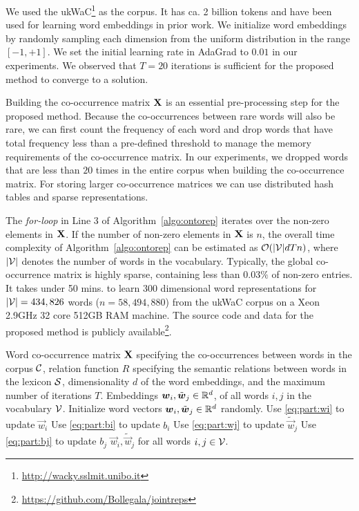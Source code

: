 \documentclass[letterpaper]{article}
\begin{document}
We used the ukWaC\footnote{\url{http://wacky.sslmit.unibo.it}} as the corpus.
It has ca. 2 billion tokens and have been used for learning word embeddings in prior work.
We initialize word embeddings by randomly sampling each dimension from the uniform distribution in the range $[-1,+1]$.
We set the initial learning rate in AdaGrad to $0.01$ in our experiments.
We observed that $T = 20$ iterations is sufficient for the proposed method to converge to a solution.

Building the co-occurrence matrix $\text{\bf X}$ is an essential pre-processing step for the proposed method.
Because the co-occurrences between rare words will also be rare, we can first count the frequency of each word and
drop words that have total frequency less than a pre-defined threshold to manage the memory requirements of the
co-occurrence matrix. In our experiments, we dropped words that are less than $20$ times in the entire corpus
when building the co-occurrence matrix.
For storing larger co-occurrence matrices we can use distributed hash tables and sparse representations.

The \emph{for-loop} in Line 3 of Algorithm~\ref{algo:ontorep} iterates over the non-zero
elements in $\text{\bf X}$. If the number of non-zero elements in $\text{\bf X}$ is $n$, the overall time complexity
of Algorithm~\ref{algo:ontorep} can be estimated as $\mathcal{O}(|\mathcal{V}|dTn)$, where $|\mathcal{V}|$ denotes the number of words
in the vocabulary.
Typically, the global co-occurrence matrix is highly sparse, containing less than $0.03\%$ of non-zero entries.
It takes under 50 mins. to learn $300$ dimensional word representations for $|\mathcal{V}| = 434,826$ words
($n = 58,494,880$) from the ukWaC corpus
on a Xeon 2.9GHz 32 core 512GB RAM machine.
The source code and data for the proposed method is publicly available\footnote{\url{https://github.com/Bollegala/jointreps}}.

\begin{algorithm}[t]
\small
\caption{Jointly learning word representations using a corpus and a semantic lexicon.}
\label{algo:ontorep}
\begin{algorithmic}[1]
\REQUIRE Word co-occurrence matrix $\text{\bf X}$ specifying the co-occurrences between words in the corpus $\mathcal{C}$,
		relation function $R$ specifying the semantic relations between words in the lexicon $\mathcal{S}$,
		dimensionality $d$ of the word embeddings, and the maximum number of iterations $T$.
\ENSURE Embeddings $\boldsymbol{w}_i, \tilde{\boldsymbol{w}}_j \in \mathbb{R}^d$, of all words $i, j$ in the vocabulary $\mathcal{V}$.
\medskip
\STATE Initialize word vectors $\boldsymbol{w}_i, \tilde{\boldsymbol{w}}_j \in \mathbb{R}^d$ randomly. \label{line:init}
		\STATE Use \eqref{eq:part:wi} to update $\vec{w}_i$
		\STATE Use \eqref{eq:part:bi} to update $b_i$
		\STATE Use \eqref{eq:part:wj} to update $\tilde{\vec{w}}_j$
		\STATE Use \eqref{eq:part:bj} to update $b_j$
	\ENDFOR
\ENDFOR
\RETURN $\vec{w}_i, \tilde{\vec{w}}_j$ for all words $i,j \in \mathcal{V}$.
\end{algorithmic}
\end{algorithm}
\end{document}
